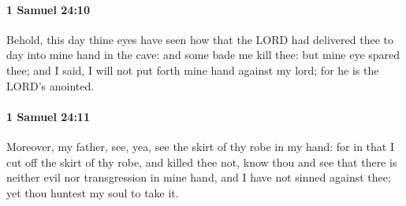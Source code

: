 		\paragraph{1 Samuel 24:10} %
			\label{1SAMUEL-24-10}

			Behold, this day thine eyes have seen how that the LORD had delivered thee to day into mine hand in the cave: and some bade me kill thee: but mine eye spared thee; and I said, I will not put forth mine hand against my lord; for he is the LORD’s anointed.


		\paragraph{1 Samuel 24:11} %
			\label{1SAMUEL-24-11}

			Moreover, my father, see, yea, see the skirt of thy robe in my hand: for in that I cut off the skirt of thy robe, and killed thee not, know thou and see that there is neither evil nor transgression in mine hand, and I have not sinned against thee; yet thou huntest my soul to take it.

